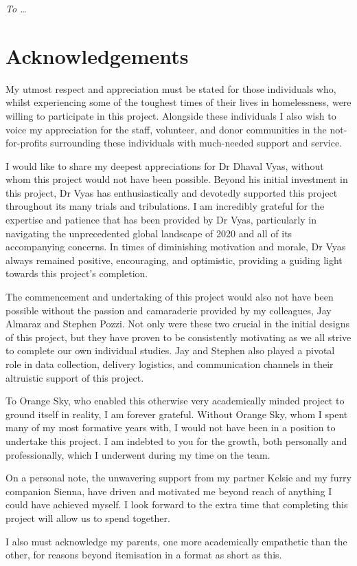 \vspace*{70mm}
\begin{center}
    \renewcommand{\baselinestretch}{1.0}
    \sl
    To \ldots
\end{center}

\chapter{Acknowledgements}

My utmost respect and appreciation must be stated for those individuals who, whilst experiencing some of the toughest times of their lives in homelessness, were willing to participate in this project. Alongside these individuals I also wish to voice my appreciation for the staff, volunteer, and donor communities in the not-for-profits surrounding these individuals with much-needed support and service.

I would like to share my deepest appreciations for Dr Dhaval Vyas, without whom this project would not have been possible. Beyond his initial investment in this project, Dr Vyas has enthusiastically and devotedly supported this project throughout its many trials and tribulations. I am incredibly grateful for the expertise and patience that has been provided by Dr Vyas, particularly in navigating the unprecedented global landscape of 2020 and all of its accompanying concerns. In times of diminishing motivation and morale, Dr Vyas always remained positive, encouraging, and optimistic, providing a guiding light towards this project's completion.

The commencement and undertaking of this project would also not have been possible without the passion and camaraderie provided by my colleagues, Jay Almaraz and Stephen Pozzi. Not only were these two crucial in the initial designs of this project, but they have proven to be consistently motivating as we all strive to complete our own individual studies. Jay and Stephen also played a pivotal role in data collection, delivery logistics, and communication channels in their altruistic support of this project.

To Orange Sky, who enabled this otherwise very academically minded project to ground itself in reality, I am forever grateful. Without Orange Sky, whom I spent many of my most formative years with, I would not have been in a position to undertake this project. I am indebted to you for the growth, both personally and professionally, which I underwent during my time on the team.

On a personal note, the unwavering support from my partner Kelsie and my furry companion Sienna, have driven and motivated me beyond reach of anything I could have achieved myself. I look forward to the extra time that completing this project will allow us to spend together.

I also must acknowledge my parents, one more academically empathetic than the other, for reasons beyond itemisation in a format as short as this. 

\cleardoublepage